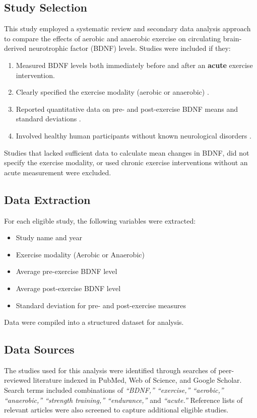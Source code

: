\documentclass[runningheads]{llncs}
\begin{document}
\subsection{Study Selection}
This study employed a systematic review and secondary data analysis approach to compare the effects of aerobic and anaerobic exercise on circulating brain-derived neurotrophic factor (BDNF) levels. Studies were included if they:
\begin{enumerate}
    \item Measured BDNF levels both immediately before and after an \textbf{acute} exercise intervention.
    \item Clearly specified the exercise modality (aerobic or anaerobic) .
    \item Reported quantitative data on pre- and post-exercise BDNF means and standard deviations .
    \item Involved healthy human participants without known neurological disorders .
\end{enumerate}

Studies that lacked sufficient data to calculate mean changes in BDNF, did not specify the exercise modality, or used chronic exercise interventions without an acute measurement were excluded.

\subsection{Data Extraction}
For each eligible study, the following variables were extracted:
\begin{itemize}
    \item Study name and year
    \item Exercise modality (Aerobic or Anaerobic)
    \item Average pre-exercise BDNF level
    \item Average post-exercise BDNF level
    \item Standard deviation for pre- and post-exercise measures
\end{itemize}

Data were compiled into a structured dataset for analysis.

\subsection{Data Sources}

The studies used for this analysis were identified through searches of peer-reviewed literature indexed in PubMed, Web of Science, and Google Scholar. Search terms included combinations of \textit{``BDNF,'' ``exercise,'' ``aerobic,'' ``anaerobic,'' ``strength training,'' ``endurance,''} and \textit{``acute.''} Reference lists of relevant articles were also screened to capture additional eligible studies. 
\end{document}
